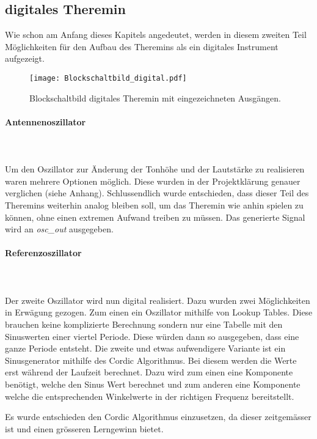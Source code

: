 \subsection{digitales Theremin}\label{subsec:Theremin_digital}

Wie schon am Anfang dieses Kapitels angedeutet, werden in diesem zweiten Teil Möglichkeiten für den Aufbau des Theremins als ein digitales Instrument aufgezeigt.
\begin{figure}[h]
	\centering
	\texttt{[image: Blockschaltbild\_digital.pdf]}
	\caption{Blockschaltbild digitales Theremin mit eingezeichneten Ausgängen.}
	\label{img:Blockschaltbild_digital}
\end{figure}

\paragraph{Antennenoszillator}\mbox{}\\
\\Um den Oszillator zur Änderung der Tonhöhe und der Lautstärke zu realisieren waren mehrere Optionen möglich. Diese wurden in der Projektklärung genauer verglichen (siehe Anhang). Schlussendlich wurde entschieden, dass dieser Teil des Theremins weiterhin analog bleiben soll, um das Theremin wie anhin spielen zu können, ohne einen extremen Aufwand treiben zu müssen. Das generierte Signal wird an \textit{osc\_out} ausgegeben.

\paragraph{Referenzoszillator}\mbox{}\\
\\Der zweite Oszillator wird nun digital realisiert. Dazu wurden zwei Möglichkeiten in Erwägung gezogen. Zum einen ein Oszillator mithilfe von Lookup Tables. Diese brauchen keine komplizierte Berechnung sondern nur eine Tabelle mit den Sinuswerten einer viertel Periode. Diese würden dann so ausgegeben, dass eine ganze Periode entsteht. Die zweite und etwas aufwendigere Variante ist ein Sinusgenerator mithilfe des Cordic Algorithmus. Bei diesem werden die Werte erst während der Laufzeit berechnet. Dazu wird zum einen eine Komponente benötigt, welche den Sinus Wert berechnet und zum anderen eine Komponente welche die entsprechenden Winkelwerte in der richtigen Frequenz bereitstellt.

Es wurde entschieden den Cordic Algorithmus einzusetzen, da dieser zeitgemässer ist und einen grösseren Lerngewinn bietet.

